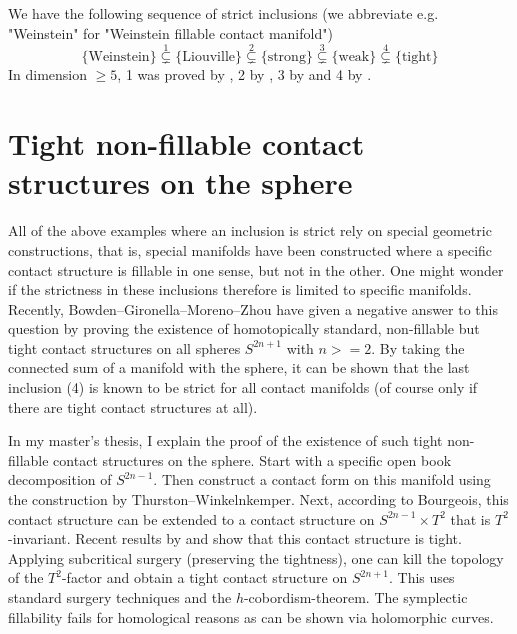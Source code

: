 \documentclass{amsart}
\begin{document}
We have the following sequence of strict inclusions (we abbreviate e.g. "Weinstein" for "Weinstein fillable contact manifold")
\[
      \{\text{Weinstein}\} \overset{1}{\subsetneq} \{\text{Liouville}\} \overset{2}{\subsetneq} \{\text{strong}\} \overset{3}{\subsetneq} \{\text{weak}\} \overset{4}{\subsetneq} \{\text{tight}\}
\]
In dimension $\ge 5$, 1 was proved by \cite[Theorem 1.5]{BCS14}, 2 by \cite{Zhou21}, 3 by \cite{BGM22} and 4 by \cite{MNW13}.



\section*{Tight non-fillable contact structures on the sphere}

All of the above examples where an inclusion is strict rely on special geometric
constructions, that is, special manifolds have been constructed where a specific
contact structure is fillable in one sense, but not in the other.
One might wonder if the strictness in these inclusions therefore is limited
to specific manifolds. 
Recently, Bowden--Gironella--Moreno--Zhou \cite{BGMZ22} have given a negative answer to this question by proving the existence of homotopically standard, non-fillable but tight contact structures on all spheres $S^{2n+1}$ with $n >= 2$.
By taking the connected sum of a manifold with the sphere, it can be shown that the last inclusion (4) is known to be strict for all contact manifolds (of course only if there are tight contact structures at all).

In my master's thesis, I explain the proof of the existence of such tight non-fillable contact structures on the sphere.
Start with a specific open book decomposition of $S^{2n-1}$.
Then construct a contact form on this manifold using the construction by Thurston--Winkelnkemper. 
Next, according to Bourgeois, this contact structure can be extended to a contact structure on $S^{2n-1}\times T^2$ that is $T^2$-invariant.
Recent results by \cite{BGM22} and \cite{AZ24} show that this contact structure is tight.
Applying subcritical surgery (preserving the tightness), one can kill the topology of the $T^2$-factor and obtain a tight contact structure on $S^{2n+1}$.
This uses standard surgery techniques and the $h$-cobordism-theorem.
The symplectic fillability fails for homological reasons as can be shown via holomorphic curves. 
\end{document}
